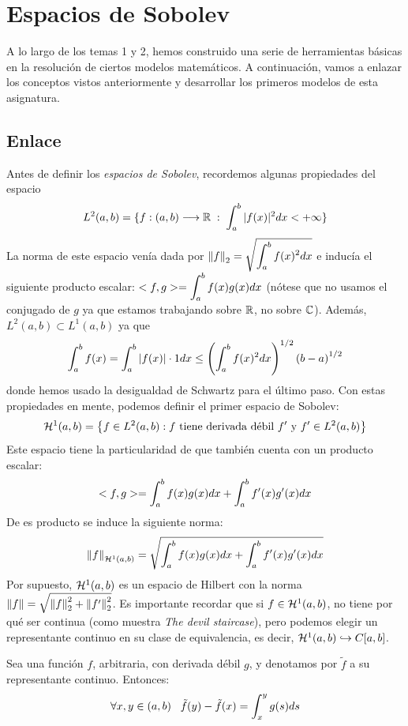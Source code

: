 \chapter{Espacios de Sobolev}

A lo largo de los temas 1 y 2, hemos construido una serie de herramientas básicas en la resolución de ciertos modelos matemáticos. A continuación, vamos a enlazar los conceptos vistos anteriormente y desarrollar los primeros modelos de esta asignatura.

\section{Enlace}

Antes de definir los \textit{espacios de Sobolev}, recordemos algunas propiedades del espacio 
\[L^2(a,b)=\displaystyle\{f : (a,b) \longrightarrow \mathbb{R}\;:\; \displaystyle\int_{ a }^{ b } |f(x)|^2dx<+\infty\displaystyle\}\]
La norma de este espacio venía dada por $\left\lVert f\right\rVert_2=\sqrt{\displaystyle\int_{ a }^{ b } f(x)^2dx}$ e inducía el siguiente producto escalar: $<f,g>=\displaystyle\int_{ a }^{ b } f(x)g(x)dx$ (nótese que no usamos el conjugado de $g$ ya que estamos trabajando sobre $\mathbb{R}$, no sobre $\mathbb{C}$). Además, $L^2(a,b)\subset L^1(a,b)$ ya que 
\[
\displaystyle\int_{ a }^{ b } f(x)=\displaystyle\int_{ a }^{ b } |f(x)|\cdot 1dx\leq \left(\displaystyle\int_{ a }^{ b } f(x)^2dx\right)^{1/2}\left(b-a\right)^{1/2}
\]
donde hemos usado la desigualdad de Schwartz para el último paso. Con estas propiedades en mente, podemos definir el primer espacio de Sobolev:
\[
\mathcal{H}^{ 1 } (a,b)=\left\{ f\in L^{ 2 }(a,b): f \text{ tiene derivada débil }f' \text{ y } f'\in L^{ 2 }(a,b) \right\}
\]
Este espacio tiene la particularidad de que también cuenta con un producto escalar:
\[
<f,g>=\displaystyle\int_{ a }^{ b } f(x)g(x)dx+\displaystyle\int_{ a }^{ b } f'(x)g'(x)dx
\]
De es producto se induce la siguiente norma:
\[
\left\lVert f\right\rVert_{\mathcal{H}^{ 1 } (a,b)}=\sqrt{\displaystyle\int_{ a }^{ b } f(x)g(x)dx+\displaystyle\int_{ a }^{ b } f'(x)g'(x)dx}
\]
Por supuesto, $\mathcal{H}^{ 1 } (a,b)$ es un espacio de Hilbert con la norma $\left\lVert f\right\rVert=\sqrt{\left\lVert f\right\rVert^2_2+\left\lVert f'\right\rVert_2^2}$. Es importante recordar que si $f\in\mathcal{H}^{ 1 } (a,b)$, no tiene por qué ser continua (como muestra \textit{The devil staircase}), pero podemos elegir un representante continuo en su clase de equivalencia, es decir, $\mathcal{H}^{ 1 } (a,b)\hookrightarrow C[a,b]$.
\begin{lemma}
Sea una función $f$, arbitraria, con derivada débil $g$, y denotamos por $\tilde{f}$ a su representante continuo. Entonces:
\[
\forall x,y\in(a,b) \;\;\; \tilde{f}(y)-\tilde{f}(x)=\displaystyle\int_{ x }^{ y } g(s)ds
\]
\end{lemma}
